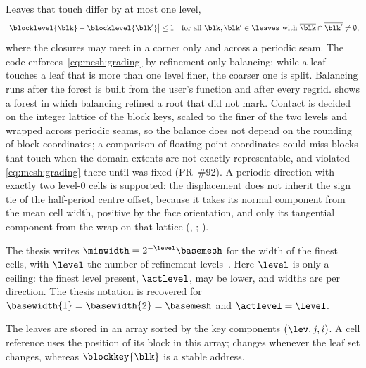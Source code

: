 Leaves that touch differ by at most one level,
\begin{equation}\label{eq:mesh:grading}
  \abs{\blocklevel{\blk}-\blocklevel{\blk'}}\le1\quad
  \text{for all }\blk,\blk'\in\leaves\text{ with }\overline{\blk}\cap\overline{\blk'}\neq\emptyset,
\end{equation}
where the closures may meet in a corner only and across a periodic seam. The
code enforces~\cref{eq:mesh:grading} by refinement-only balancing: while a
leaf touches a leaf that is more than one level finer, the coarser one is
split. Balancing runs after the forest is built from the user's 
function and after every regrid.  shows a forest in which
balancing refined a root that  did not mark. Contact is decided on
the integer lattice of the block keys, scaled to the finer of the two levels and
wrapped across periodic seams, so the balance does not depend on the rounding of
block coordinates; a comparison of floating-point coordinates could miss blocks
that touch when the domain extents are not exactly representable, and violated
\cref{eq:mesh:grading} there until  was fixed (PR~\#92). A periodic
direction with exactly two level-0 cells is supported: the displacement does not
inherit the sign tie of the half-period centre offset, because it takes its
normal component from the mean cell width, positive by the face orientation, and
only its tangential component from the wrap on that lattice
(, ;
).

The thesis writes $\minwidth=2^{-\level}\basemesh$ for the width of the finest
cells, with $\level$ the number of refinement levels~. Here
$\level$ is only a ceiling: the finest level present, $\actlevel$, may be lower,
and widths are per direction. The thesis notation is recovered for
$\basewidth{1}=\basewidth{2}=\basemesh$ and $\actlevel=\level$.

The leaves are stored in an array sorted by the key components $(\lev,j,i)$.
A cell reference  uses the position  of its
block in this array;  changes whenever the leaf set changes, whereas
$\blockkey{\blk}$ is a stable address.



